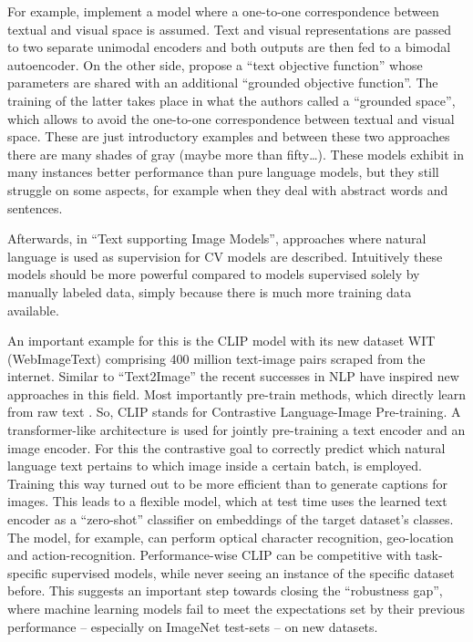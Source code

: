 \documentclass[
]{krantz}
\begin{document}
For example, \citet{silberer2012grounded} implement a model where a one-to-one correspondence between textual and visual space is assumed.
Text and visual representations are passed to two separate unimodal encoders and both outputs are then fed to a bimodal autoencoder.
On the other side, \citet{bordes2020incorporating} propose a ``text objective function'' whose parameters are shared with an additional ``grounded objective function''.
The training of the latter takes place in what the authors called a ``grounded space'', which allows to avoid the one-to-one correspondence between textual and visual space.
These are just introductory examples and between these two approaches there are many shades of gray (maybe more than fifty\ldots).
These models exhibit in many instances better performance than pure language models, but they still struggle on some aspects, for example when they deal with abstract words and sentences.

Afterwards, in ``Text supporting Image Models'', approaches where natural language is used as supervision for CV models are described.
Intuitively these models should be more powerful compared to models supervised solely by manually labeled data, simply because there is much more training data available.

An important example for this is the CLIP model \citep{radford2021learning} with its new dataset WIT (WebImageText) comprising 400 million text-image pairs scraped from the internet.
Similar to ``Text2Image'' the recent successes in NLP have inspired new approaches in this field.
Most importantly pre-train methods, which directly learn from raw text \citep[e. g. GPT-n, Generative Pre-trained Transformer;][]{brown2020language}.
So, CLIP stands for Contrastive Language-Image Pre-training.
A transformer-like architecture is used for jointly pre-training a text encoder and an image encoder.
For this the contrastive goal to correctly predict which natural language text pertains to which image inside a certain batch, is employed.
Training this way turned out to be more efficient than to generate captions for images.
This leads to a flexible model, which at test time uses the learned text encoder as a ``zero-shot'' classifier on embeddings of the target dataset's classes.
The model, for example, can perform optical character recognition, geo-location and action-recognition.
Performance-wise CLIP can be competitive with task-specific supervised models, while never seeing an instance of the specific dataset before.
This suggests an important step towards closing the ``robustness gap'', where machine learning models fail to meet the expectations set by their previous performance -- especially on ImageNet test-sets -- on new datasets.
\end{document}
